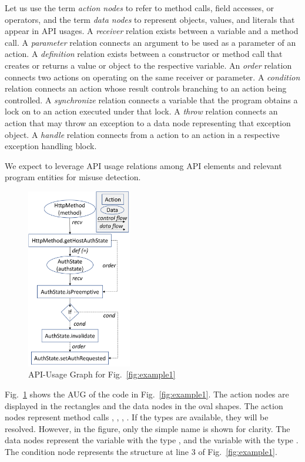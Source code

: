 Let us use the term {\em action nodes} to refer to method calls, field
accesses, or operators, and the term {\em data nodes} to represent
objects, values, and literals that appear in API usages. A {\em
  receiver} relation exists between a variable and a method call. A
{\em parameter} relation connects an argument to be used as a
parameter of an action. A {\em definition} relation exists between a
constructor or method call that creates or returns a value or object
to the respective variable. An {\em order} relation connects two
actions on operating on the same receiver or parameter. A {\em
  condition} relation connects an action whose result controls
branching to an action being controlled. A {\em synchronize} relation
connects a variable that the program obtains a lock on to an action
executed under that lock. A {\em throw} relation connects an action
that may throw an exception to a data node representing that exception
object. A {\em handle} relation connects from a  action to
an action in a respective exception handling block.

We expect to leverage API usage relations among API elements
and relevant program entities for misuse detection.

\begin{figure}[t] %
	\centering
	\includegraphics[width=1.8in]{aug}
        \vspace{-3pt}
	\caption{API-Usage Graph for Fig.~\ref{fig:example1}}
	\label{fig:aug}
\end{figure}

Fig.~\ref{fig:aug} shows the AUG of the code in
Fig.~\ref{fig:example1}.  The action nodes are displayed in the
rectangles and the data nodes in the oval shapes. The action nodes
represent method calls ,
, ,
. If the types are available,
they will be resolved. However, in the figure, only the simple name is
shown for clarity. The data nodes represent the variable 
with the type , and the variable 
with the type . The condition node 
represents the  structure at line 3 of
Fig.~\ref{fig:example1}.

